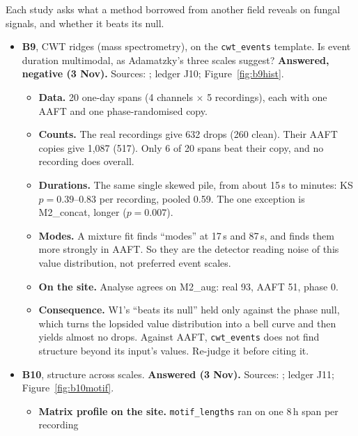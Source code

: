 \begin{instructions}
Each study asks what a method borrowed from another field reveals on fungal signals, and whether it beats its null.
\begin{itemize}
  \item \textbf{B9}, CWT ridges (mass spectrometry), on the \texttt{cwt\_events} template. Is event duration
        multimodal, as Adamatzky's three scales suggest? \textbf{Answered, negative (3 Nov).}
        Sources: ; ledger J10; Figure~\ref{fig:b9hist}.
        \begin{itemize}
          \item \textbf{Data.} 20 one-day spans (4 channels $\times$ 5 recordings), each with one AAFT and one
                phase-randomised copy.
          \item \textbf{Counts.} The real recordings give 632 drops (260 clean). Their AAFT copies give 1,087 (517).
                Only 6 of 20 spans beat their copy, and no recording does overall.
          \item \textbf{Durations.} The same single skewed pile, from about 15\,s to minutes: KS $p=0.39$--0.83 per
                recording, pooled 0.59. The one exception is M2\_concat, longer ($p=0.007$).
          \item \textbf{Modes.} A mixture fit finds ``modes'' at 17\,s and 87\,s, and finds them more strongly in
                AAFT. So they are the detector reading noise of this value distribution, not preferred event scales.
          \item \textbf{On the site.} Analyse agrees on M2\_aug: real 93, AAFT 51, phase 0.
          \item \textbf{Consequence.} W1's ``beats its null'' held only against the phase null, which turns the
                lopsided value distribution into a bell curve and then yields almost no drops. Against AAFT,
                \texttt{cwt\_events} does not find structure beyond its input's values. Re-judge it before citing it.
        \end{itemize}
  \item \textbf{B10}, structure across scales. \textbf{Answered (3 Nov).}
        Sources: ; ledger J11; Figure~\ref{fig:b10motif}.
        \begin{itemize}
          \item \textbf{Matrix profile on the site.} \texttt{motif\_lengths} ran on one 8\,h span per recording

\end{itemize}
\end{itemize}
\end{instructions}
